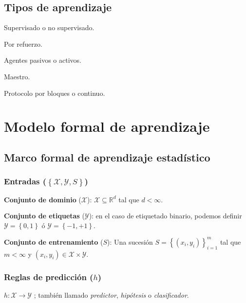 \documentclass[8pt,a4paper]{extarticle}
\begin{document}
\begin{multicols}{3}
\subsection*{Tipos de aprendizaje}

\begin{bulletlist}
\item Supervisado o no supervisado.
\item Por refuerzo.
\item Agentes pasivos o activos.
\item Maestro.
\item Protocolo por bloques o continuo.
\end{bulletlist}

\newpage

\section{Modelo formal de aprendizaje}

\subsection{Marco formal de aprendizaje estadístico}

\subsubsection*{Entradas ($\left\{ \mathcal{X}, \mathcal{Y}, S \right\} $)}

\begin{bulletlist}
\item \textbf{Conjunto de dominio} ($\mathcal{X}$): $\mathcal{X} \subseteq \mathbb{R}^d$ tal que $d < \infty$.
\item \textbf{Conjunto de etiquetas} ($\mathcal{Y}$): en el caso de etiquetado binario, podemos definir $\mathcal{Y} = \left\{ 0,1 \right\} $ ó $\mathcal{Y} = \left\{ -1,+1 \right\} $.
\item \textbf{Conjunto de entrenamiento} ($S$): Una sucesión $\displaystyle S = \left\{ \left( x_i, y_i \right)  \right\}_{i = 1}^m $ tal que $m < \infty$ y $\left( x_i, y_i \right) \in \mathcal{X} \times \mathcal{Y}$.
\end{bulletlist}

\subsubsection*{Reglas de predicción ($h$)}

$h : \mathcal{X} \to \mathcal{Y}$ ; también llamado \emph{predictor}, \emph{hipótesis} o \emph{clasificador}.


\end{multicols}
\end{document}
